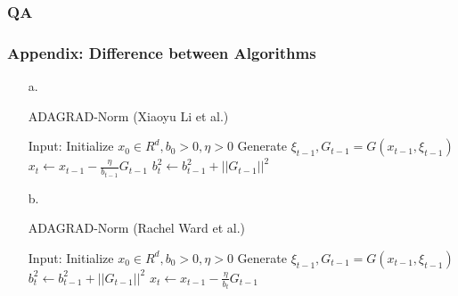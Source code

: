 \documentclass{beamer}
\begin{document}
\begin{frame}
\frametitle{QA}

\end{frame}
\begin{frame}
\frametitle{Appendix: Difference between Algorithms}
\begin{enumerate}
    \item [a.]
    \begin{algorithm}[H]
    	\caption{ADAGRAD-Norm (Xiaoyu Li et al.)} 
    	\begin{algorithmic}[1]
                \State Input: Initialize $x_0\in \textit{R}^d,b_0>0,\eta>0$
    			\State Generate $\xi_{t-1},G_{t-1}=G(x_{t-1},\xi_{t-1})$
                    \color{red}\State $x_t\leftarrow x_{t-1}-\frac{\eta}{b_{t-1}}G_{t-1}$
                    \State $b_t^2\leftarrow b_{t-1}^2+||G_{t-1}||^2$\color{black}
    		\EndFor
	      \end{algorithmic} 
        \end{algorithm}
    \item [b.] 
    \begin{algorithm}[H]
    	\caption{ADAGRAD-Norm (Rachel Ward et al.)} 
    	\begin{algorithmic}[1]
                    \State Input: Initialize $x_0\in \textit{R}^d,b_0>0,\eta>0$
        			\State Generate $\xi_{t-1},G_{t-1}=G(x_{t-1},\xi_{t-1})$
                        \color{blue}\State $b_t^2\leftarrow b_{t-1}^2+||G_{t-1}||^2$
                        \State $x_t\leftarrow x_{t-1}-\frac{\eta}{b_{t}}G_{t-1}$\color{black}
                        
        		\EndFor
    	\end{algorithmic} 
        \end{algorithm}
\end{enumerate}
\end{frame}
\end{document}
